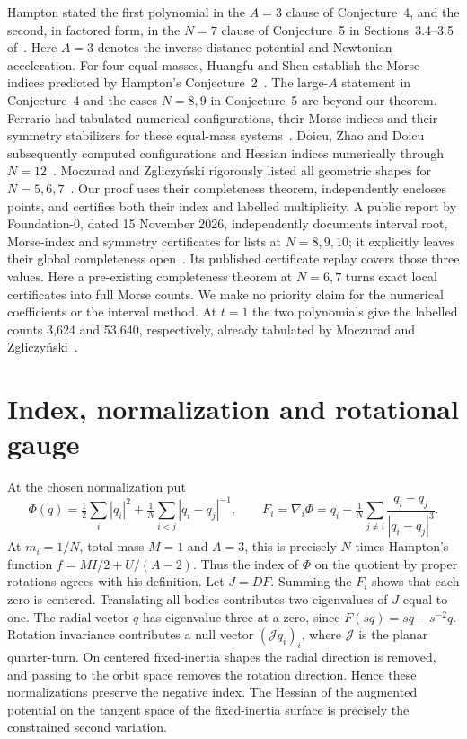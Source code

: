\documentclass[10pt]{article}
\begin{document}
Hampton stated the first polynomial in the $A=3$ clause of Conjecture~4, and the second, in factored form, in the $N=7$ clause of Conjecture~5 in Sections~3.4--3.5 of~\cite{hampton}. Here $A=3$ denotes the inverse-distance potential and Newtonian acceleration. For four equal masses, Huangfu and Shen establish the Morse indices predicted by Hampton's Conjecture~2~\cite{four}. The large-$A$ statement in Conjecture~4 and the cases $N=8,9$ in Conjecture~5 are beyond our theorem. Ferrario had tabulated numerical configurations, their Morse indices and their symmetry stabilizers for these equal-mass systems~\cite{ferrario}. Doicu, Zhao and Doicu subsequently computed configurations and Hessian indices numerically through $N=12$~\cite{doicu}. Moczurad and Zgliczyński rigorously listed all geometric shapes for $N=5,6,7$~\cite{mz}. Our proof uses their completeness theorem, independently encloses points, and certifies both their index and labelled multiplicity. A public report by Foundation-0, dated 15 November 2026, independently documents interval root, Morse-index and symmetry certificates for lists at $N=8,9,10$; it explicitly leaves their global completeness open~\cite{f0}. Its published certificate replay covers those three values. Here a pre-existing completeness theorem at $N=6,7$ turns exact local certificates into full Morse counts. We make no priority claim for the numerical coefficients or the interval method. At $t=1$ the two polynomials give the labelled counts 3,624 and 53,640, respectively, already tabulated by Moczurad and Zgliczyński~\cite[Table~3]{nearequal}.

\section{Index, normalization and rotational gauge}
At the chosen normalization put
\[
 \Phi(q)=\tfrac12\sum_i |q_i|^2+\tfrac1N\sum_{i<j}|q_i-q_j|^{-1},
 \qquad F_i=\nabla_i\Phi=q_i-\tfrac1N\sum_{j\ne i}\frac{q_i-q_j}{|q_i-q_j|^3}.
\]
At $m_i=1/N$, total mass $M=1$ and $A=3$, this is precisely $N$ times Hampton's function $f=MI/2+U/(A-2)$. Thus the index of $\Phi$ on the quotient by proper rotations agrees with his definition. Let $J=DF$. Summing the $F_i$ shows that each zero is centered. Translating all bodies contributes two eigenvalues of $J$ equal to one. The radial vector $q$ has eigenvalue three at a zero, since $F(sq)=sq-s^{-2}q$. Rotation invariance contributes a null vector $(\mathcal J q_i)_i$, where $\mathcal J$ is the planar quarter-turn. On centered fixed-inertia shapes the radial direction is removed, and passing to the orbit space removes the rotation direction. Hence these normalizations preserve the negative index. The Hessian of the augmented potential on the tangent space of the fixed-inertia surface is precisely the constrained second variation.
\end{document}
